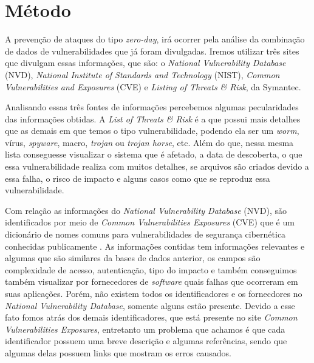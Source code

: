 \section{Método}
A prevenção de ataques do tipo \textit{zero-day}, irá ocorrer pela análise da combinação de dados 
de vulnerabilidades que já foram divulgadas. Iremos utilizar três sites que divulgam essas 
informações, que são: o \textit{National Vulnerability Database} (NVD), \textit{National Institute 
of Standards and Technology} (NIST), \textit{Common Vulnerabilities and Exposures} (CVE) e
\textit{Listing of Threats \& Risk}, da Symantec.

Analisando essas três fontes de informações percebemos algumas pecularidades das informações 
obtidas. A \textit{List of Threats \& Risk} é a que possui mais detalhes que as demais em que 
temos o tipo vulnerabilidade, podendo ela ser um \textit{worm}, vírus, \textit{spyware}, macro, 
\textit{trojan} ou \textit{trojan horse}, etc. Além do que, nessa mesma lista conseguesse 
visualizar o sistema que é afetado, a data de descoberta, o que essa vulnerabilidade realiza com
muitos detalhes, se arquivos são criados devido a essa falha, o risco de impacto e alguns casos como 
que se reproduz essa vulnerabilidade. 

Com relação as informações do \textit{National Vulnerability Database} (NVD), são identificados por meio de
\textit{Common Vulnerabilities Exposures} (CVE) que é um dicionário de nomes comuns para vulnerabilidades de segurança 
cibernética conhecidas publicamente \cite{MITRE:2017}. As informações contidas tem informações relevantes e algumas que 
são similares da bases de dados anterior, os campos são complexidade de acesso, autenticação, tipo do impacto e também 
conseguimos também visualizar por fornecedores de \textit{software} quais falhas que ocorreram em suas aplicações. 
Porém, não existem todos os identificadores e os fornecdores no \textit{National Vulnerability Database}, somente alguns estão presente.
Devido a esse fato fomos atrás dos demais identificadores, que está presente no site \textit{Common Vulnerabilities Exposures}, 
entretanto um problema que achamos é que cada identificador possuem uma breve descrição e algumas referências, sendo que algumas delas 
possuem links que mostram os erros causados.

